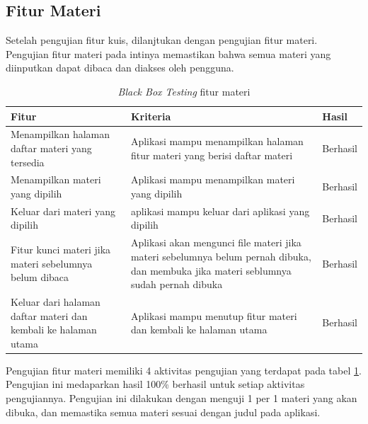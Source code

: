 \subsection{Fitur Materi}
Setelah pengujian fitur kuis, dilanjtukan dengan pengujian fitur materi. Pengujian fitur materi pada intinya memastikan bahwa semua materi yang diinputkan dapat dibaca dan diakses oleh pengguna.
\begin{table}[H]
	\centering
	\caption{\textit{Black Box Testing} fitur materi}
	\label{Tab:blackBoxMateri}
	\begin{tabular}{|p{}|p{}|p{}|}
		\hline
		 \centering\textbf{Fitur} & \multicolumn{1}{m{0.45\textwidth}|}{\centering \textbf{Kriteria}}&  \multicolumn{1}{m{0.1\textwidth}|}{\centering \textbf{Hasil}}\\
		\hline
		Menampilkan halaman daftar materi yang tersedia
		& Aplikasi mampu menampilkan halaman fitur materi yang berisi daftar materi
		& Berhasil\\
		\hline
		Menampilkan materi yang dipilih
		& Aplikasi mampu menampilkan materi yang dipilih
		& Berhasil\\
		\hline
		Keluar dari materi yang dipilih
		& aplikasi mampu keluar dari aplikasi yang dipilih
		& Berhasil\\
		\hline
		Fitur kunci materi jika materi sebelumnya belum dibaca
		& Aplikasi akan mengunci file materi jika materi sebelumnya belum pernah dibuka, dan membuka jika materi seblumnya sudah pernah dibuka
		& Berhasil\\
		\hline
		Keluar dari halaman daftar materi dan kembali ke halaman utama
		& Aplikasi mampu menutup fitur materi dan kembali ke halaman utama
		& Berhasil\\
		\hline
	\end{tabular}
\end{table}
Pengujian fitur materi memiliki 4 aktivitas pengujian yang terdapat pada tabel \ref*{Tab:blackBoxMateri}.
Pengujian ini medaparkan hasil 100\% berhasil untuk setiap aktivitas pengujiannya.
Pengujian ini dilakukan dengan menguji 1 per 1 materi yang akan dibuka, dan memastika semua materi sesuai dengan judul pada aplikasi.
\newpage
